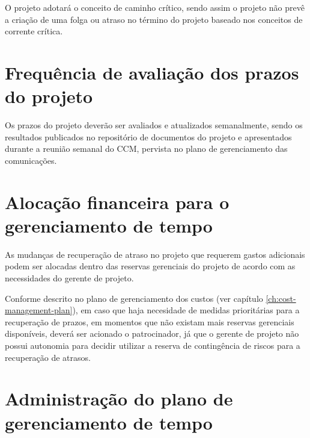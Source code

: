O projeto adotará o conceito de caminho crítico, sendo assim o projeto não prevê a criação de uma folga ou atraso no término do projeto baseado nos conceitos de corrente crítica.



\section{Frequência de avaliação dos prazos do projeto}

Os prazos do projeto deverão ser avaliados e atualizados semanalmente, sendo os resultados publicados no repositório de documentos do projeto e apresentados durante a reunião semanal do CCM, pervista no plano de gerenciamento das comunicações.

\section{Alocação financeira para o gerenciamento de tempo}

As mudanças de recuperação de atraso no projeto que requerem gastos adicionais podem ser alocadas dentro das reservas gerenciais do projeto de acordo com as necessidades do gerente de projeto.

Conforme descrito no plano de gerenciamento dos custos (ver capítulo \ref{ch:cost-management-plan}), em caso que haja necesidade de medidas prioritárias para a recuperação de prazos, em momentos que não existam mais reservas gerenciais disponíveis, deverá ser acionado o patrocinador, já que o gerente de projeto não possui autonomia para decidir utilizar a reserva de contingência de riscos para a recuperação de atrasos.

\section{Administração do plano de gerenciamento de tempo}

